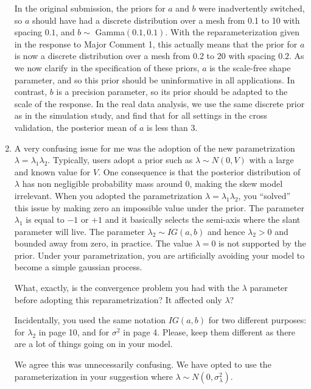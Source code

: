 \documentclass[11pt]{article}
\begin{document}
\begin{enumerate}[1.]
\begin{response}
  In the original submission, the priors for $a$ and $b$ were inadvertently switched, so $a$ should have had a discrete distribution over a mesh from 0.1 to 10 with spacing $0.1$, and $b \sim$ Gamma$(0.1, 0.1)$.
  With the reparameterization given in the response to Major Comment 1, this actually means that the prior for $a$ is now a discrete distribution over a mesh from 0.2 to 20 with spacing $0.2$.
  As we now clarify in the specification of these priors, $a$ is the scale-free shape parameter, and so this prior should be uninformative in all applications.
  In contrast, $b$ is a precision parameter, so its prior should be adapted to the scale of the response.
  In the real data analysis, we use the same discrete prior as in the simulation study, and find that for all settings in the cross validation, the posterior mean of $a$ is less than 3.
\end{response}

\item A very confusing issue for me was the adoption of the new parametrization $\lambda = \lambda_1 \lambda_2$. Typically, users adopt a prior such as $\lambda \sim N(0,V)$ with a large and known value for $V$. One consequence is that the posterior distribution of $\lambda$ has non negligible probability mass around 0, making the skew model irrelevant. When you adopted the parametrization $\lambda = \lambda_1 \lambda_2$, you ``solved'' this issue by making zero an impossible value under the prior. The parameter $\lambda_1$ is equal to $−1$ or $+1$ and it basically selects the semi-axis where the slant parameter will live. The parameter $\lambda_2 \sim IG(a, b)$ and hence $\lambda_2 > 0$ and bounded away from zero, in practice. The value $\lambda = 0$ is not supported by the prior. Under your parametrization, you are artificially avoiding your model to become a simple gaussian process.

What, exactly, is the convergence problem you had with the $\lambda$ parameter before adopting this reparametrization?
It affected only $\lambda$?

Incidentally, you used the same notation $IG(a,b)$ for two different purposes: for $\lambda_2$ in page 10, and for $\sigma^2$ in page 4. Please, keep them different as there are a lot of things going on in your model.\\

\begin{response}
  We agree this was unnecessarily confusing.
  We have opted to use the parameterization in your suggestion where $\lambda \sim N(0, \sigma^2_\lambda)$.
\end{response}


\end{enumerate}
\end{document}
